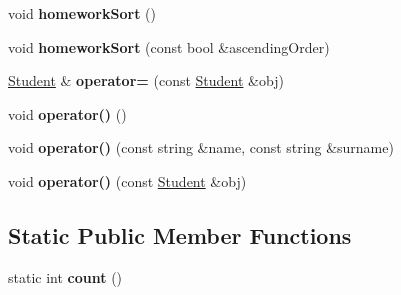 \begin{DoxyCompactItemize}
void {\bfseries homework\+Sort} ()
\item 
\mbox{\label{class_student_af501bf8b55c45acd6e9fb9a733e8e16d}} 
void {\bfseries homework\+Sort} (const bool \&ascending\+Order)
\item 
\mbox{\label{class_student_aec341d7386eede6f896d6a8e55519160}} 
\mbox{\hyperlink{class_student}{Student}} \& {\bfseries operator=} (const \mbox{\hyperlink{class_student}{Student}} \&obj)
\item 
\mbox{\label{class_student_ac72ab2472e64e81872a6a0e7788e6bf2}} 
void {\bfseries operator()} ()
\item 
\mbox{\label{class_student_ac9e72d7b06529e5abe4b00ec2983b471}} 
void {\bfseries operator()} (const string \&name, const string \&surname)
\item 
\mbox{\label{class_student_ac101e0e01253db1f035ebb2456ffd0c4}} 
void {\bfseries operator()} (const \mbox{\hyperlink{class_student}{Student}} \&obj)
\end{DoxyCompactItemize}
\subsection*{Static Public Member Functions}
\begin{DoxyCompactItemize}
\item 
\mbox{\label{class_student_aa77bae5103947b47835d9177c3b7ad78}} 
static int {\bfseries count} ()
\end{DoxyCompactItemize}

